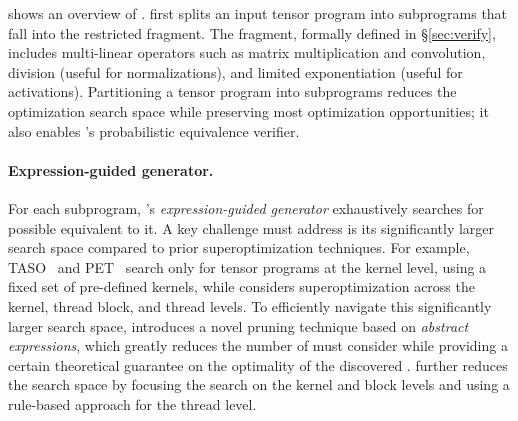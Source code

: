  shows an overview of \sys.
\sys first splits an input tensor program into subprograms that fall into the restricted \lax fragment.
The \lax fragment, formally defined in \S\ref{sec:verify}, includes multi-linear operators such as matrix multiplication and convolution, division (useful for normalizations), and limited exponentiation (useful for activations).
%
Partitioning a tensor program into \lax subprograms reduces the optimization search space while preserving most optimization opportunities; it also enables \sys's probabilistic equivalence verifier.
%

\paragraph{Expression-guided \graph generator.}
For each \lax subprogram, \sys's {\em expression-guided generator} exhaustively searches for possible \graphs equivalent to it.
A key challenge \sys must address is its significantly larger search space compared to prior superoptimization techniques.
%
For example, TASO~\cite{TASO} and PET~\cite{wang2021pet} search only for tensor programs at the kernel level, using a fixed set of pre-defined kernels, while \sys considers superoptimization across the kernel, thread block, and thread levels.
%
To efficiently navigate this significantly larger search space, \sys introduces a novel pruning technique based on {\em abstract expressions}, which greatly reduces the number of \graphs \sys must consider while providing a certain theoretical guarantee on the optimality of the discovered \graphs.
\sys further reduces the search space by focusing the search on the kernel and block levels and using a rule-based approach for the thread level. 

